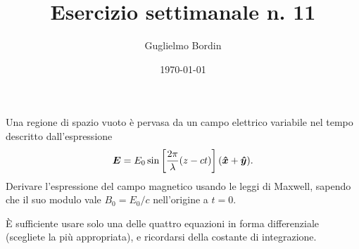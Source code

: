 \documentclass[10pt]{gulartcl}
\title{Esercizio settimanale n. 11}
\author{Guglielmo Bordin}
\date{\today}
\begin{document}
\maketitle 

\noindent
Una regione di spazio vuoto è pervasa da un campo elettrico variabile nel
tempo descritto dall’espressione
\[
    \bm{E} = E_0 \sin\left[\frac{2\pi}{\lambda}(z - ct)\right]
          (\bm{\hat{x}} + \bm{\hat{y}}).
\]
Derivare l’espressione del campo magnetico usando le leggi di Maxwell,
sapendo che il suo modulo vale $B_0 = E_0 / c$ nell’origine a $t = 0$.

\bigbreak
\begin{hint}
È sufficiente usare solo una delle quattro equazioni in forma differenziale
(scegliete la più appropriata), e ricordarsi della costante di
integrazione.
\end{hint}
\end{document}
